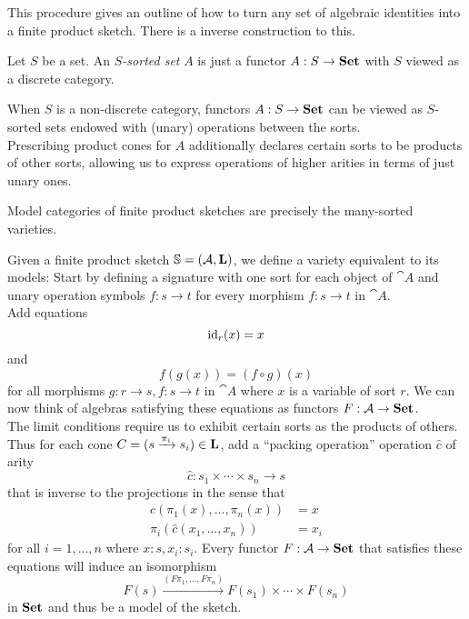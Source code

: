 This procedure gives an outline of how to turn any set of algebraic identities into a finite product sketch. There is a inverse construction to this.

\begin{Definition}
Let $S$ be a set. An \emph{$S$-sorted set} $A$ is just a functor $A : S \to \mathbf{Set}$ with $S$ viewed as a discrete category.
\end{Definition}

When $S$ is a non-discrete category, functors $A : S \to \mathbf{Set}$ can be viewed as $S$-sorted sets endowed with (unary) operations between the sorts. \\

Prescribing product cones for $A$ additionally declares certain sorts to be products of other sorts, allowing us to express operations of higher arities in terms of just unary ones.
 
\begin{Proposition}\label{prop:modelsarevarieties}
Model categories of finite product sketches are precisely the many-sorted varieties.
\end{Proposition}
\begin{Proof}
Given a finite product sketch $\mathbb S = (\mathcal{A}, \textbf{L})$, we define a variety equivalent to its models: Start by defining a signature with one sort for each object of $\cat A$ and unary operation symbols $f : s \to t$ for every morphism $f : s \to t$ in $\cat A$. \\

Add equations
\[ \textrm{id}_r(x) = x \]
and
\[ f(g(x)) = (f \circ g)(x)  \]
for all morphisms $g : r \to s, f : s \to t$ in $\cat A$ where $x$ is a variable of sort $r$. We can now think of algebras satisfying these equations as functors $F : \mathcal{A} \to \mathbf{Set}$. \\

The limit conditions require us to exhibit certain sorts as the products of others. Thus for each cone $C = (s \xrightarrow{\pi_i} s_i) \in \textbf{L}$, add a ``packing operation'' operation $\hat c$ of arity
\[ \hat c : s_1 \times \cdots \times s_n \to s \]
that is inverse to the projections in the sense that
\begin{align*}
\hat c(\pi_1(x), \ldots, \pi_n(x)) &= x \\
\pi_i(\hat c(x_1, \ldots, x_n)) &= x_i
\end{align*}
for all $i=1,\ldots,n$ where $x : s, x_i : s_i$.
Every functor $F : \mathcal{A} \to \mathbf{Set}$ that satisfies these equations will induce an isomorphism
\[ F(s) \xrightarrow{(F\pi_1,\ldots, F\pi_n)} F(s_1) \times \cdots \times F(s_n) \]
in $\mathbf{Set}$ and thus be a model of the sketch.
\end{Proof}

